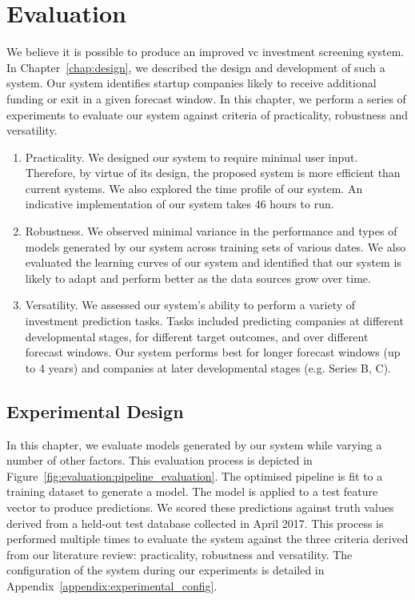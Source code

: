 \documentclass[../thesis/thesis.tex]{subfiles}
\begin{document}
\chapter{Evaluation}
\label{chap:evaluation}

We believe it is possible to produce an improved \gls{vc} investment screening system. In Chapter~\ref{chap:design}, we described the design and development of such a system. Our system identifies startup companies likely to receive additional funding or exit in a given forecast window. In this chapter, we perform a series of experiments to evaluate our system against criteria of practicality, robustness and versatility.

\begin{enumerate}

\item Practicality. We designed our system to require minimal user input. Therefore, by virtue of its design, the proposed system is more efficient than current systems. We also explored the time profile of our system. An indicative implementation of our system takes 46 hours to run.

\item Robustness. We observed minimal variance in the performance and types of models generated by our system across training sets of various dates. We also evaluated the learning curves of our system and identified that our system is likely to adapt and perform better as the data sources grow over time.

\item Versatility. We assessed our system's ability to perform a variety of investment prediction tasks. Tasks included predicting companies at different developmental stages, for different target outcomes, and over different forecast windows. Our system performs best for longer forecast windows (up to 4 years) and companies at later developmental stages (e.g. Series B, C).

\end{enumerate}

\section{Experimental Design}

In this chapter, we evaluate models generated by our system while varying a number of other factors. This evaluation process is depicted in Figure~\ref{fig:evaluation:pipeline_evaluation}. The optimised pipeline is fit to a training dataset to generate a model. The model is applied to a test feature vector to produce predictions. We scored these predictions against truth values derived from a held-out test database collected in April 2017. This process is performed multiple times to evaluate the system against the three criteria derived from our literature review: practicality, robustness and versatility. The configuration of the system during our experiments is detailed in Appendix~\ref{appendix:experimental_config}.
\end{document}
